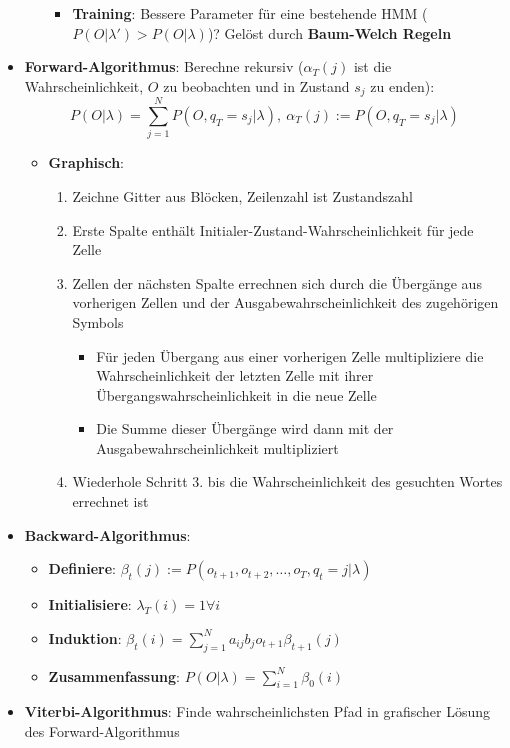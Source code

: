 \begin{itemize}
\begin{itemize}
\begin{itemize}
			\item \textbf{Training}: Bessere Parameter für eine bestehende HMM ($P(O|\lambda') > P(O|\lambda)$)? Gelöst durch \textbf{Baum-Welch Regeln}
		\end{itemize}
	\end{itemize}
	\item \textbf{Forward-Algorithmus}: Berechne rekursiv ($\alpha_T(j)$ ist die Wahrscheinlichkeit, $O$ zu beobachten und in Zustand $s_j$ zu enden):
	$$
		P(O|\lambda) = \sum^N_{j=1}P(O, q_T = s_j | \lambda),\ \alpha_T(j) := P(O, q_T = s_j|\lambda)
	$$
	\begin{itemize}
		\item \textbf{Graphisch}:
		\begin{enumerate}
			\item Zeichne Gitter aus Blöcken, Zeilenzahl ist Zustandszahl
			\item Erste Spalte enthält Initialer-Zustand-Wahrscheinlichkeit für jede Zelle
			\item Zellen der nächsten Spalte errechnen sich durch die Übergänge aus vorherigen Zellen und der Ausgabewahrscheinlichkeit des zugehörigen Symbols
			\begin{itemize}
				\item Für jeden Übergang aus einer vorherigen Zelle multipliziere die Wahrscheinlichkeit der letzten Zelle mit ihrer Übergangswahrscheinlichkeit in die neue Zelle
				\item Die Summe dieser Übergänge wird dann mit der Ausgabewahrscheinlichkeit multipliziert
			\end{itemize}
			\item Wiederhole Schritt 3. bis die Wahrscheinlichkeit des gesuchten Wortes errechnet ist
		\end{enumerate}
	\end{itemize}
	\item \textbf{Backward-Algorithmus}:
	\begin{itemize}
		\item \textbf{Definiere}: $\beta_t(j) := P(o_{t+1}, o_{t+2}, \dots, o_T, q_t = j | \lambda)$
		\item \textbf{Initialisiere}: $\lambda_T(i) = 1 \forall i$
		\item \textbf{Induktion}: $\beta_t(i) = \sum^N_{j=1}a_{ij}b_jo_{t+1}\beta_{t+1}(j)$
		\item \textbf{Zusammenfassung}: $P(O|\lambda) = \sum^N_{i=1}\beta_0(i)$
	\end{itemize}
	\item \textbf{Viterbi-Algorithmus}: Finde wahrscheinlichsten Pfad in grafischer Lösung des Forward-Algorithmus
\end{itemize}